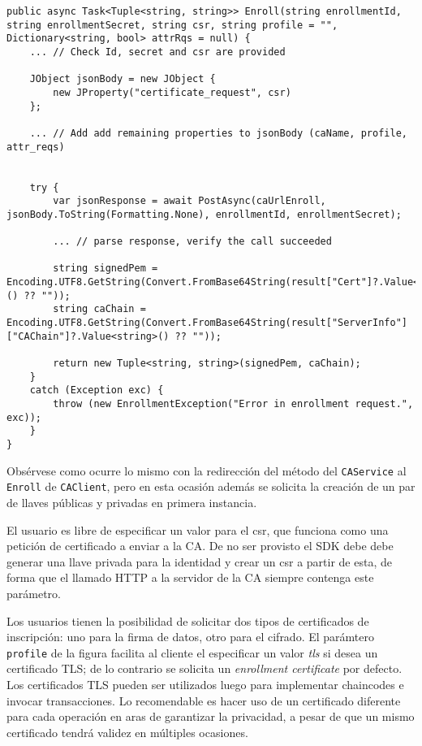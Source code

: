 \begin{lstlisting}[caption={M\'etodo \texttt{Enroll} de la clase \texttt{CAClient}.}, label={code:enrollClient}]
public async Task<Tuple<string, string>> Enroll(string enrollmentId, string enrollmentSecret, string csr, string profile = "", Dictionary<string, bool> attrRqs = null) {
	... // Check Id, secret and csr are provided
	
	JObject jsonBody = new JObject {
		new JProperty("certificate_request", csr)
	};
	
	... // Add add remaining properties to jsonBody (caName, profile, attr_reqs)
	

	try {
		var jsonResponse = await PostAsync(caUrlEnroll, 	jsonBody.ToString(Formatting.None), enrollmentId, enrollmentSecret);

		... // parse response, verify the call succeeded

		string signedPem = Encoding.UTF8.GetString(Convert.FromBase64String(result["Cert"]?.Value<string>() ?? ""));
		string caChain = Encoding.UTF8.GetString(Convert.FromBase64String(result["ServerInfo"]["CAChain"]?.Value<string>() ?? ""));

		return new Tuple<string, string>(signedPem, caChain);
	}
	catch (Exception exc) {
		throw (new EnrollmentException("Error in enrollment request.", exc));
	}
}
\end{lstlisting}

Obs\'ervese como ocurre lo mismo con la redirecci\'on del m\'etodo del \texttt{CAService} al \texttt{Enroll} de \texttt{CAClient}, pero en esta ocasi\'on adem\'as se solicita la creaci\'on de un par de llaves p\'ublicas y privadas en primera instancia.

El usuario es libre de especificar un valor para el csr, que funciona como una petici\'on de certificado a enviar a la CA. De no ser provisto el SDK debe debe generar una llave privada para la identidad y crear un csr a partir de esta, de forma que el llamado HTTP a la servidor de la CA siempre contenga este par\'ametro.

Los usuarios tienen la posibilidad de solicitar dos tipos de certificados de inscripción: uno para la firma de datos, otro para el cifrado. El par\'amtero \texttt{profile} de la figura facilita al cliente el especificar un valor \emph{tls} si desea un certificado TLS; de lo contrario se solicita un \emph{enrollment certificate} por defecto. Los certificados TLS pueden ser utilizados luego para implementar chaincodes e invocar transacciones. Lo recomendable es hacer uso de un certificado diferente para cada operaci\'on en aras de garantizar la privacidad, a pesar de que un mismo certificado tendr\'a validez en m\'ultiples ocasiones.

